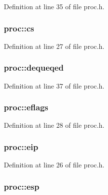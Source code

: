 \-Definition at line 35 of file proc.\-h.

\hypertarget{structproc_a5f1ddc555dad12aa7c3bb8137612da1a}{
\subsubsection[{cs}]{ {\bf proc\-::cs}}}\label{structproc_a5f1ddc555dad12aa7c3bb8137612da1a}


\-Definition at line 27 of file proc.\-h.

\hypertarget{structproc_aa9f51aaaa65bdfe5220f65452b5b28d6}{
\subsubsection[{dequeqed}]{ {\bf proc\-::dequeqed}}}\label{structproc_aa9f51aaaa65bdfe5220f65452b5b28d6}


\-Definition at line 37 of file proc.\-h.

\hypertarget{structproc_a41e1d85590672d7aed7298c2553d1f6a}{
\subsubsection[{eflags}]{ {\bf proc\-::eflags}}}\label{structproc_a41e1d85590672d7aed7298c2553d1f6a}


\-Definition at line 28 of file proc.\-h.

\hypertarget{structproc_a3df0fefa9b51a7e21c35c8c9fbc4f725}{
\subsubsection[{eip}]{ {\bf proc\-::eip}}}\label{structproc_a3df0fefa9b51a7e21c35c8c9fbc4f725}


\-Definition at line 26 of file proc.\-h.

\hypertarget{structproc_aaeb0661f9e28aaad812437f33b0fea16}{
\subsubsection[{esp}]{ {\bf proc\-::esp}}}\label{structproc_aaeb0661f9e28aaad812437f33b0fea16}


